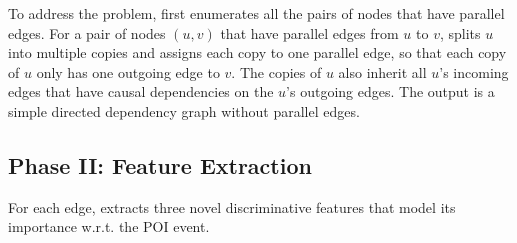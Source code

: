 To address the problem, 
\tool first enumerates all the pairs of nodes that have parallel edges.
For a pair of nodes $(u,v)$ that have parallel edges from $u$ to $v$,
\tool splits $u$ into multiple copies and assigns each copy to one parallel edge, so that each copy of $u$ only has one outgoing edge to $v$. The copies of $u$ also inherit all $u$'s incoming edges that have causal dependencies on the $u$'s outgoing edges.
The output 
is a simple directed dependency graph without parallel edges.



\subsection{Phase II: Feature Extraction}
\label{subsec:feature-extraction}
For each edge, \tool extracts three novel discriminative features that model its importance w.r.t. the POI event.


